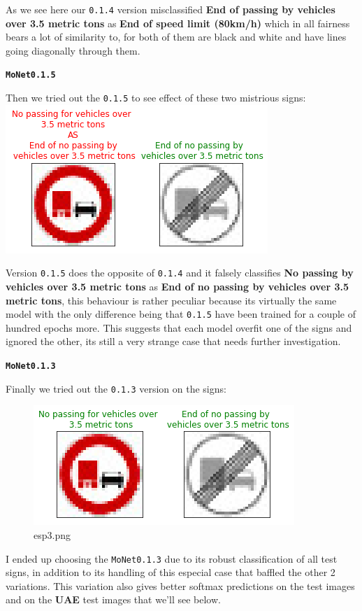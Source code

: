 \documentclass[11pt]{article}
\makeatletter
\def\maxwidth{\ifdim\Gin@nat@width>\linewidth\linewidth
    \else\Gin@nat@width\fi}
\let\Oldincludegraphics\includegraphics
\renewcommand{\includegraphics}[1]{\Oldincludegraphics[width=.8\maxwidth]{#1}}
\makeatother
\begin{document}
As we see here our \texttt{0.1.4} version misclassified \textbf{End of
passing by vehicles over 3.5 metric tons} as \textbf{End of speed limit
(80km/h)} which in all fairness bears a lot of similarity to, for both
of them are black and white and have lines going diagonally through
them.

\textbf{\texttt{MoNet0.1.5}}

Then we tried out the \texttt{0.1.5} to see effect of these two
mistrious signs: \includegraphics{./assets/esp2.png}

Version \texttt{0.1.5} does the opposite of \texttt{0.1.4} and it
falsely classifies \textbf{No passing by vehicles over 3.5 metric tons}
as \textbf{End of no passing by vehicles over 3.5 metric tons}, this
behaviour is rather peculiar because its virtually the same model with
the only difference being that \texttt{0.1.5} have been trained for a
couple of hundred epochs more. This suggests that each model overfit one
of the signs and ignored the other, its still a very strange case that
needs further investigation.

\textbf{\texttt{MoNet0.1.3}}

Finally we tried out the \texttt{0.1.3} version on the signs:

\begin{figure}
\centering
\includegraphics{./assets/esp3.png}
\caption{esp3.png}
\end{figure}

I ended up choosing the \texttt{MoNet0.1.3} due to its robust
classification of all test signs, in addition to its handling of this
especial case that baffled the other 2 variations. This variation also
gives better softmax predictions on the test images and on the
\textbf{UAE} test images that we'll see below.
\end{document}
